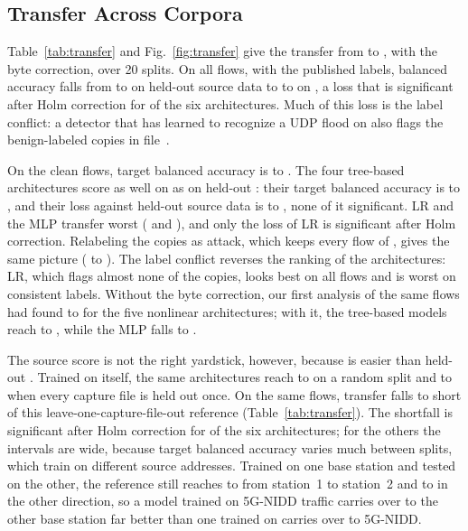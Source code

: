 \subsection{Transfer Across Corpora}
\label{sec:res:transfer}

Table~\ref{tab:transfer} and Fig.~\ref{fig:transfer} give the transfer from \DA{} to \DB{}, with the byte correction, over 20 splits. On all flows, with the published labels, balanced accuracy falls from \RSrcBAmin{} to \RSrcBAmax{} on held-out source data to \RTrAllBAmin{} to \RTrAllBAmax{} on \DB{}, a loss that is significant after Holm correction for \RTrAllSigNbN{} of the six architectures. Much of this loss is the label conflict: a detector that has learned to recognize a UDP flood on \DA{} also flags the benign-labeled copies in file~\LcBenignFile{}.

On the clean flows, target balanced accuracy is \RTrCleanBAmin{} to \RTrCleanBAmax. The four tree-based architectures score as well on \DB{} as on held-out \DA{}: their target balanced accuracy is \RTrTreeCleanBAmin{} to \RTrTreeCleanBAmax{}, and their loss against held-out source data is \RTrTreeCleanDmin{} to \RTrTreeCleanDmax{}, none of it significant. LR and the MLP transfer worst (\RTrLRCleanBA{} and \RTrMLPCleanBA), and only the loss of LR is significant after Holm correction. Relabeling the copies as attack, which keeps every flow of \DB{}, gives the same picture (\RTrRelabBAmin{} to \RTrRelabBAmax). The label conflict reverses the ranking of the architectures: LR, which flags almost none of the copies, looks best on all flows and is worst on consistent labels. Without the byte correction, our first analysis of the same flows had found \RPrevCleanOthMin{} to \RPrevCleanOthMax{} for the five nonlinear architectures; with it, the tree-based models reach \RTrTreeCleanBAmin{} to \RTrTreeCleanBAmax{}, while the MLP falls to \RTrMLPCleanBA.

The source score is not the right yardstick, however, because \DB{} is easier than held-out \DA{}. Trained on \DB{} itself, the same architectures reach \RRefRandCleanmin{} to \RRefRandCleanmax{} on a random split and \RRefLofoCleanmin{} to \RRefLofoCleanmax{} when every capture file is held out once. On the same flows, transfer falls \RGapCleanMin{} to \RGapCleanMax{} short of this leave-one-capture-file-out reference (Table~\ref{tab:transfer}). The shortfall is significant after Holm correction for \RGapCleanSigN{} of the six architectures; for the others the intervals are wide, because target balanced accuracy varies much between splits, which train on different source addresses. Trained on one base station and tested on the other, the reference still reaches \RRefSoneCleanmin{} to \RRefSoneCleanmax{} from station~1 to station~2 and \RRefStwoCleanmin{} to \RRefStwoCleanmax{} in the other direction, so a model trained on 5G-NIDD traffic carries over to the other base station far better than one trained on \DA{} carries over to 5G-NIDD.

